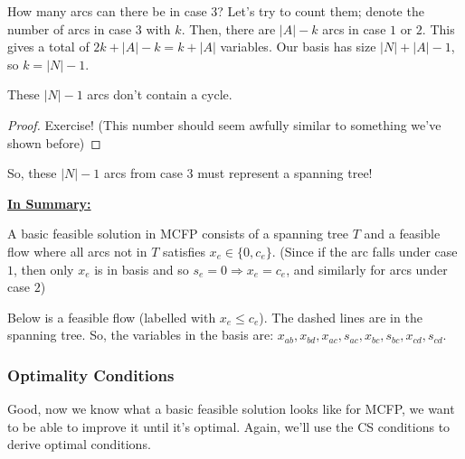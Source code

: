 How many arcs can there be in case $3$?
Let's try to count them; denote the number of arcs in case $3$ with $k$.
Then, there are $|A| - k$ arcs in case $1$ or $2$.
This gives a total of $2k + |A| - k = k + |A|$ variables.
Our basis has size $|N| + |A| - 1$, so $k = |N| - 1$.
\begin{remark}
    These $|N| - 1$ arcs don't contain a cycle.
\end{remark}
\begin{proof}
Exercise! (This number should seem awfully similar to something we've shown before)
\end{proof}
So, these $|N| - 1$ arcs from case $3$ must represent a spanning tree!

\underline{\textbf{In Summary:}}

A basic feasible solution in MCFP consists of a spanning tree $T$  and a feasible flow where all arcs not in $T$ satisfies $x_e \in \{0, c_e\}$. (Since if the arc falls under case $1$, then only $x_e$ is in basis and so $s_e = 0 \Rightarrow x_e = c_e$, and similarly for arcs under case $2$)

\begin{example}{}{}
Below is a feasible flow (labelled with $x_e \leq c_e$). The dashed lines are in the spanning tree. So, the variables in the basis are: $x_{ab}, x_{bd}, x_{ac}, s_{ac}, x_{bc}, s_{bc}, x_{cd}, s_{cd}$.

\begin{minipage}{\textwidth}
    \centering
\end{minipage}
\end{example}

\subsubsection{Optimality Conditions}
Good, now we know what a basic feasible solution looks like for MCFP, we want to be able to improve it until it's optimal.
Again, we'll use the CS conditions to derive optimal conditions.

